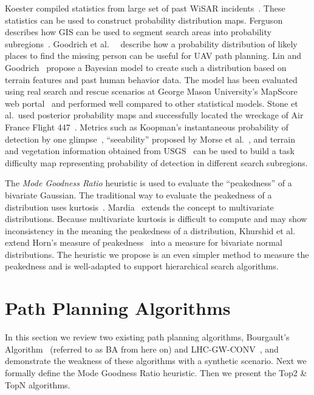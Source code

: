 Koester compiled statistics from large set of past WiSAR incidents~\cite{Koester2008Lost}. These statistics can be used to construct probability distribution maps. Ferguson describes how GIS can be used to segment search areas into probability subregions~\cite{Ferguson2008GIS}. Goodrich et al.\ ~\cite{Goodrich2008Supporting} describe how a probability distribution of likely places to find the missing person can be useful for UAV path planning. Lin and Goodrich~\cite{Lin2010Bayesian} propose a Bayesian model to create such a distribution based on terrain features and past human behavior data. The model has been evaluated using real search and rescue scenarios at George Mason University's MapScore web portal~\cite{Twardy2012MapScore}
and performed well compared to other statistical models. Stone et al.\ used posterior probability maps and successfully located the wreckage of Air France Flight 447~\cite{Stone2011Search}. Metrics such as Koopman's instantaneous probability of detection by one glimpse~\cite{Koopman1956Theory}, ``seeability'' proposed by Morse et al.\ \cite{Morse2010UAV}, and terrain and vegetation information obtained from USGS~\cite{Lin2010Bayesian} can be used to build a task difficulty map representing probability of detection in different search subregions.

The \textit{Mode Goodness Ratio} heuristic is used to evaluate the ``peakedness'' of a bivariate Gaussian. The traditional way to evaluate the peakedness of a distribution uses kurtosis~\cite{Balanda1988Kurtosis}. Mardia~\cite{Mardia1970Measures} extends the concept to multivariate distributions. Because multivariate kurtosis is difficult to compute and may show inconsistency in the meaning the peakedness
of a distribution, Khurshid et al.\ ~\cite{Khurshid2007Note} extend Horn's measure of peakedness~\cite{Horn1983Measure} into a measure for bivariate normal distributions. The heuristic we propose is an even simpler method to measure the peakedness and is well-adapted to support hierarchical search algorithms.

\section{Path Planning Algorithms}
\label{sec:PathPlanningAlgorithms}

In this section we review two existing path planning algorithms, Bourgault's Algorithm~\cite{Bourgault2006Optimal} (referred to as BA from here on) and LHC-GW-CONV~\cite{Lin2009UAV}, and demonstrate the weakness of these algorithms with a synthetic scenario. Next we formally define the Mode Goodness Ratio heuristic. Then we present the Top2 \& TopN algorithms.

